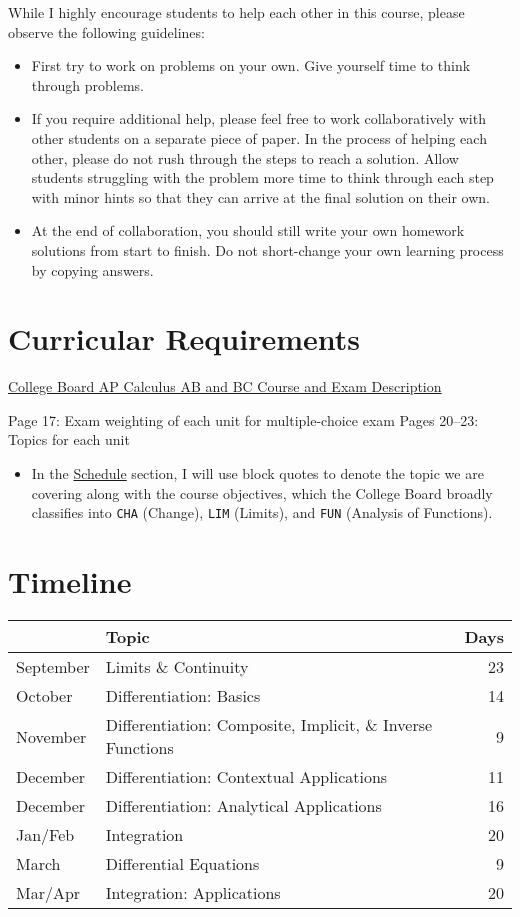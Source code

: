 \documentclass[12pt,fleqn]{article}
\providecommand{\tightlist}{%
  \setlength{\itemsep}{0pt}\setlength{\parskip}{0pt}}
\begin{document}
While I highly encourage students to help each other in this course, please observe the following guidelines:

\begin{itemize}
\tightlist
\item
  First try to work on problems on your own. Give yourself time to think through problems.
\item
  If you require additional help, please feel free to work collaboratively with other students on a separate piece of paper. In the process of helping each other, please do not rush through the steps to reach a solution. Allow students struggling with the problem more time to think through each step with minor hints so that they can arrive at the final solution on their own.
\item
  At the end of collaboration, you should still write your own homework solutions from start to finish. Do not short-change your own learning process by copying answers.
\end{itemize}

\hypertarget{curricular-requirements}{%
\section{Curricular Requirements}\label{curricular-requirements}}

\href{https://apcentral.collegeboard.org/pdf/ap-calculus-ab-bc-course-and-exam-description-0.pdf?course=ap-calculus-ab}{College Board AP Calculus AB and BC Course and Exam Description}

Page 17: Exam weighting of each unit for multiple-choice exam
Pages 20--23: Topics for each unit

\begin{itemize}
\tightlist
\item
  In the \protect\hyperlink{sch}{Schedule} section, I will use block quotes to denote the topic we are covering along with the course objectives, which the College Board broadly classifies into \texttt{CHA} (Change), \texttt{LIM} (Limits), and \texttt{FUN} (Analysis of Functions).
\end{itemize}

\hypertarget{timeline}{%
\section{Timeline}\label{timeline}}

\begin{longtable}[]{@{}llr@{}}
\toprule
& Topic & Days\tabularnewline
\midrule
\endhead
September & Limits \& Continuity & 23\tabularnewline
October & Differentiation: Basics & 14\tabularnewline
November & Differentiation: Composite, Implicit, \& Inverse Functions & 9\tabularnewline
December & Differentiation: Contextual Applications & 11\tabularnewline
December & Differentiation: Analytical Applications & 16\tabularnewline
Jan/Feb & Integration & 20\tabularnewline
March & Differential Equations & 9\tabularnewline
Mar/Apr & Integration: Applications & 20\tabularnewline
\bottomrule
\end{longtable}
\end{document}
